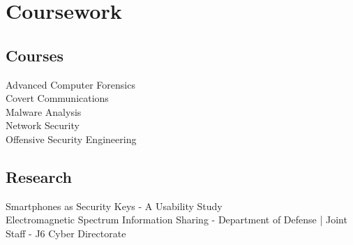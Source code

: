 \documentclass[letterpaper]{deedy-resume} %
\begin{document}
\begin{minipage}[t]{0.28\textwidth}



\section{Coursework}

\subsection{Courses}

Advanced Computer Forensics \\
Covert Communications \\
Malware Analysis \\
Network Security \\
Offensive Security Engineering

\sectionspace %



\subsection{Research}
Smartphones as Security Keys - A Usability Study \textbullet{} \\
Electromagnetic Spectrum Information Sharing - Department of Defense | Joint Staff - J6 Cyber Directorate \\

\sectionspace %




\end{minipage}
\end{document}
